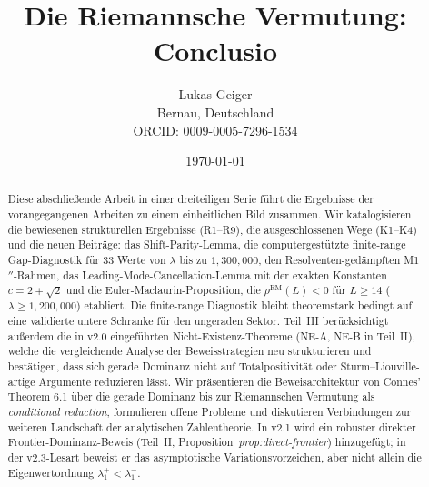 \documentclass[12pt,a4paper]{article}
\title{Die Riemannsche Vermutung: Conclusio}
\author{Lukas Geiger\\
\small Bernau, Deutschland\\
\small ORCID: \href{https://orcid.org/0009-0005-7296-1534}{0009-0005-7296-1534}}
\date{\today}
\theoremstyle{definition}
\theoremstyle{remark}
\begin{document}
\maketitle

\begin{abstract}\small
Diese abschließende Arbeit in einer dreiteiligen Serie führt die Ergebnisse der vorangegangenen Arbeiten zu einem einheitlichen Bild zusammen. Wir katalogisieren die bewiesenen strukturellen Ergebnisse (R1--R9), die ausgeschlossenen Wege (K1--K4) und die neuen Beiträge: das Shift-Parity-Lemma, die computergestützte finite-range Gap-Diagnostik für 33 Werte von $\lambda$ bis zu $1{,}300{,}000$, den Resolventen-gedämpften M1$''$-Rahmen, das Leading-Mode-Cancellation-Lemma mit der exakten Konstanten $c = 2 + \sqrt{2}$ und die Euler-Maclaurin-Proposition, die $\rho^{\mathrm{EM}}(L) < 0$ für $L \geq 14$ ($\lambda \geq 1{,}200{,}000$) etabliert. Die finite-range Diagnostik bleibt theoremstark bedingt auf eine validierte untere Schranke für den ungeraden Sektor. Teil~III berücksichtigt außerdem die in v2.0 eingeführten Nicht-Existenz-Theoreme (NE-A, NE-B in Teil~II), welche die vergleichende Analyse der Beweisstrategien neu strukturieren und bestätigen, dass sich gerade Dominanz nicht auf Totalpositivität oder Sturm--Liouville-artige Argumente reduzieren lässt. Wir präsentieren die Beweisarchitektur von Connes' Theorem 6.1 über die gerade Dominanz bis zur Riemannschen Vermutung als \emph{conditional reduction}, formulieren offene Probleme und diskutieren Verbindungen zur weiteren Landschaft der analytischen Zahlentheorie. In v2.1 wird ein robuster direkter Frontier-Dominanz-Beweis (Teil~II, Proposition~\emph{prop:direct-frontier}) hinzugefügt; in der v2.3-Lesart beweist er das asymptotische Variationsvorzeichen, aber nicht allein die Eigenwertordnung $\lambda_1^+<\lambda_1^-$.


\end{abstract}
\end{document}
